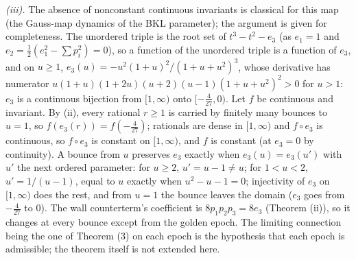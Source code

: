 \emph{(iii).} The absence of nonconstant continuous invariants is classical for this map (the Gauss-map dynamics of the BKL parameter); the argument is given for completeness. The unordered triple is the root set of $t^{3} - t^{2} - e_{3}$ (as $e_{1} = 1$ and $e_{2} = \tfrac12(e_{1}^{2} - \sum p_{i}^{2}) = 0$), so a function of the unordered triple is a function of $e_{3}$, and on $u \geq 1$, $e_{3}(u) = -u^{2}(1 + u)^{2}/(1 + u + u^{2})^{3}$, whose derivative has numerator $u(1 + u)(1 + 2u)(u + 2)(u - 1)(1 + u + u^{2})^{2} > 0$ for $u > 1$: $e_{3}$ is a continuous bijection from $[1, \infty)$ onto $[-\tfrac{4}{27}, 0)$. Let $f$ be continuous and invariant. By (ii), every rational $r \geq 1$ is carried by finitely many bounces to $u = 1$, so $f(e_{3}(r)) = f(-\tfrac{4}{27})$; rationals are dense in $[1, \infty)$ and $f\circ e_{3}$ is continuous, so $f\circ e_{3}$ is constant on $[1, \infty)$, and $f$ is constant (at $e_{3} = 0$ by continuity). A bounce from $u$ preserves $e_{3}$ exactly when $e_{3}(u) = e_{3}(u')$ with $u'$ the next ordered parameter: for $u \geq 2$, $u' = u - 1 \neq u$; for $1 < u < 2$, $u' = 1/(u - 1)$, equal to $u$ exactly when $u^{2} - u - 1 = 0$; injectivity of $e_{3}$ on $[1,\infty)$ does the rest, and from $u = 1$ the bounce leaves the domain ($e_{3}$ goes from $-\tfrac{4}{27}$ to $0$). The wall counterterm's coefficient is $8p_{1}p_{2}p_{3} = 8e_{3}$ (Theorem (ii)), so it changes at every bounce except from the golden epoch. The limiting connection being the one of Theorem (3) on each epoch is the hypothesis that each epoch is admissible; the theorem itself is not extended here.
